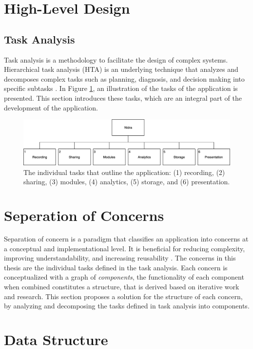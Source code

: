 

\section{High-Level Design}

\subsection{Task Analysis}
Task analysis is a methodology to facilitate the design of complex systems. Hierarchical task analysis (HTA) is an underlying technique that analyzes and decomposes complex tasks such as planning, diagnosis, and decision making into specific subtasks \cite{ta}. In Figure \ref{fig:hta_overview}, an illustration of the tasks of the application is presented. This section introduces these tasks, which are an integral part of the development of the application.

\begin{figure}
    \centering
    \includegraphics[scale=0.23]{images/TA.png}
    \caption{The individual tasks that outline the application: (1) recording, (2) sharing, (3) modules, (4) analytics, (5) storage, and (6) presentation.}
    \label{fig:hta_overview}
\end{figure}



\section{Seperation of Concerns}\label{design_soc}
Separation of concern is a paradigm that classifies an application into concerns at a conceptual and implementational level. It is beneficial for reducing complexity, improving understandability, and increasing reusability \cite{soc}. The concerns in this thesis are the individual tasks defined in the task analysis. Each concern is conceptualized with a graph of \textit{components}, the functionality of each component when combined constitutes a {structure}, that is derived based on iterative work and research. This section proposes a solution for the structure of each concern, by analyzing and decomposing the tasks defined in task analysis into components.



\section{Data Structure}


